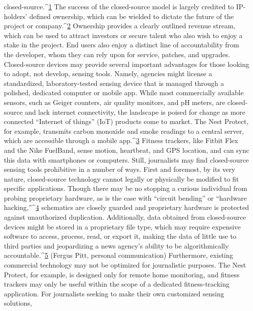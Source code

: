 closed-source.^{\href{#endnotes-schroyer}{1}} The success of the closed-source model is largely credited to
IP-holders' defined ownership, which can be wielded to dictate the future of
the project or company.^{\href{#endnotes-schroyer}{2}} Ownership provides a clearly outlined revenue
stream, which can be used to attract investors or secure talent who also
wish to enjoy a stake in the project. End users also enjoy a distinct line of
accountability from the developer, whom they can rely upon for service,
patches, and upgrades.
Closed-source devices may provide several important advantages for those
looking to adopt, not develop, sensing tools. Namely, agencies might license
a standardized, laboratory-tested sensing device that is managed through a
polished, dedicated computer or mobile app. While most commercially available
sensors, such as Geiger counters, air quality monitors, and pH meters,
are closed-source and lack internet connectivity, the landscape is poised for
change as more connected ``Internet of things'' (IoT) products come to market.
The Nest Protect, for example, transmits carbon monoxide and smoke
readings to a central server, which are accessible through a mobile app.^{\href{#endnotes-schroyer}{3}} Fitness
trackers, like Fitbit Flex and the Nike FuelBand, sense motion, heartbeat,
and GPS location, and can sync this data with smartphones or computers.
Still, journalists may find closed-source sensing tools prohibitive in a number
of ways. First and foremost, by its very nature, closed-source technology
cannot legally or physically be modified to fit specific applications. Though
there may be no stopping a curious individual from probing proprietary
hardware, as is the case with ``circuit bending'' or ``hardware hacking,''^{\href{#endnotes-schroyer}{4}} schematics are closely guarded and proprietary hardware is protected against
unauthorized duplication. Additionally, data obtained from closed-source
devices might be stored in a proprietary file type, which may require expensive
software to access, process, read, or export it, making the data of little
use to third parties and jeopardizing a news agency's ability to be algorithmically
accountable.^{\href{#endnotes-schroyer}{5}} (Fergus Pitt, personal communication) Furthermore,
existing commercial technology may not be optimized for journalistic purposes.
The Nest Protect, for example, is designed only for remote home
monitoring, and fitness trackers may only be useful within the scope of a
dedicated fitness-tracking application.
For journalists seeking to make their own customized sensing solutions,
